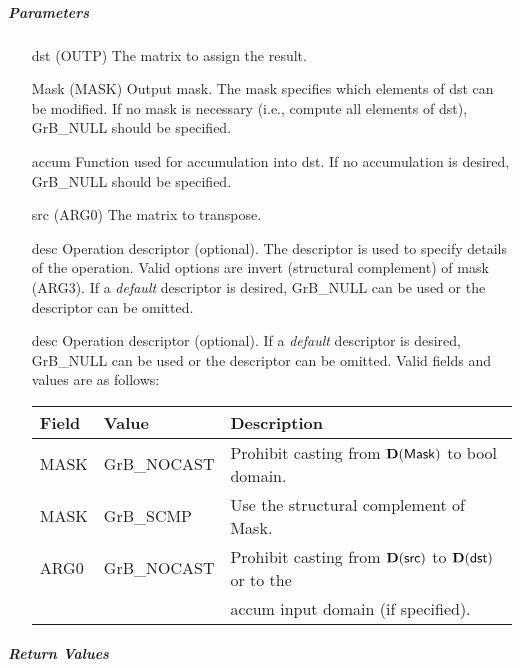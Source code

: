 \subparagraph{Parameters}

\begin{itemize}[leftmargin=1.1in]
    \item[{\sf dst}]   ({\sf OUTP}) The matrix to assign the result.

    \item[{\sf Mask}]  ({\sf MASK}) Output mask. The mask specifies which elements
    of {\sf dst} can be modified. If no mask is necessary (i.e., compute all
    elements of {\sf dst}), {\sf GrB\_NULL} should be specified.

    \item[{\sf accum}] Function used for accumulation into {\sf dst}.  If no accumulation
                        is desired, {\sf GrB\_NULL} should be specified.

    \item[{\sf src}]   ({\sf ARG0}) The matrix to transpose.

    \item[{\sf desc}]  Operation descriptor (optional). The descriptor
    is used to specify details of the operation. Valid options are 
    invert (structural complement) of mask ({\sf ARG3}). If
    a \emph{default} descriptor is desired,    {\sf GrB\_NULL} can be
    used or the descriptor can be omitted.

    \item[{\sf desc}]   Operation descriptor (optional). If a
    \emph{default} descriptor is desired, {\sf GrB\_NULL} can be
    used or the descriptor can be omitted.  Valid fields and values are as follows: \\
    \begin{tabular}{lll}
    Field  & Value & Description \\
    \hline
    {\sf MASK} & {\sf GrB\_NOCAST} & Prohibit casting from $\bold{D}({\sf Mask})$ to {\sf bool} domain. \\
    {\sf MASK} & {\sf GrB\_SCMP}   & Use the structural complement of {\sf Mask}. \\
    {\sf ARG0} & {\sf GrB\_NOCAST} & Prohibit casting from $\bold{D}({\sf src})$ to $\bold{D}({\sf dst})$ or to the \\ & & accum input domain (if specified). \\
    \end{tabular}
\end{itemize}

\subparagraph{Return Values}


